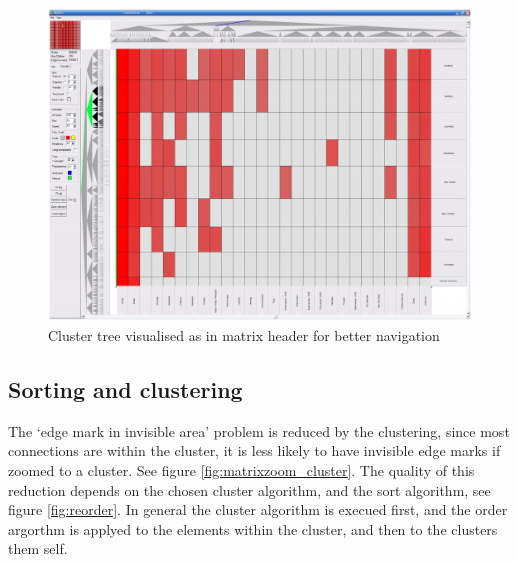 \begin{figure}[h]
\centering
\includegraphics[width=\textwidth]{images/matrixzoom_abello}
\caption{Cluster tree visualised as in matrix header for better navigation \citep{abello} \label{fig:matrixzoom_abello}}
\end{figure}





\subsection{Sorting and clustering}   

The ‘edge mark in invisible area' problem is reduced by the clustering, since most connections are within the cluster, it is less likely to have invisible edge marks if zoomed to a cluster. See figure \ref{fig:matrixzoom_cluster}. 
The quality of this reduction depends on the chosen cluster algorithm, and the sort algorithm, see figure \ref{fig:reorder}. In general the cluster algorithm is execued first, and the order argorthm is applyed to the elements within the cluster, and then to the clusters them self.

